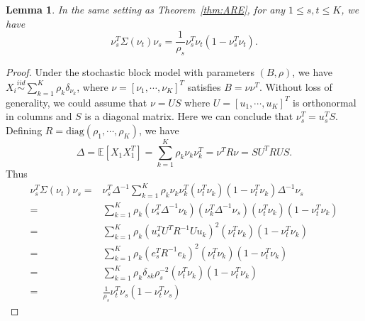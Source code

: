 \documentclass[10pt,letterpaper]{article}
\newtheorem{lemma}[fact]{Lemma}
\renewcommand{\Re}{\mathbb{R}}
\newcommand{\Ex}{\mathbb{E}}
\begin{document}
\begin{lemma}
\label{lm:mseForm}
In the same setting as Theorem~\ref{thm:ARE}, for any $1 \le s, t \le K$, we have
\[
	\nu_s^T \Sigma(\nu_t) \nu_s = \frac{1}{\rho_s} \nu_s^T \nu_t (1- \nu_s^T \nu_t).
\]
\end{lemma}
\begin{proof}
Under the stochastic block model with parameters $(B, \rho)$, we have $X_i \stackrel{iid}{\sim} \sum_{k=1}^K \rho_k \delta_{\nu_k}$, where $\nu = [\nu_1, \cdots, \nu_K]^T$ satisfies $B = \nu \nu^T$. Without loss of generality, we could assume that $\nu = U S$ where $U = [u_1, \cdots, u_K]^T$ is orthonormal in columns and $S$ is a diagonal matrix. Here we can conclude that $\nu_s^T = u_s^T S$. Defining $R = \text{diag}(\rho_1, \cdots, \rho_K)$, we have
\[
	\Delta = \Ex[X_1 X_1^T] = \sum_{k=1}^K \rho_k \nu_k \nu_k^T = \nu^T R \nu = S U^T R U S.
\]
Thus
\begin{align*}
	\nu_s^T \Sigma(\nu_t) \nu_s = &
    \nu_s^T \Delta^{-1} \sum_{k=1}^K \rho_k \nu_k \nu_k^T (\nu_t^T \nu_k)(1 - \nu_t^T \nu_k) \Delta^{-1} \nu_s \\
    = & \sum_{k=1}^K \rho_k (\nu_s^T \Delta^{-1} \nu_k) (\nu_k^T \Delta^{-1} \nu_s) (\nu_t^T \nu_k) (1 - \nu_t^T \nu_k) \\
    = & \sum_{k=1}^K \rho_k (u_s^T U^T R^{-1} U u_k)^2 (\nu_t^T \nu_k) (1 - \nu_t^T \nu_k) \\
    = & \sum_{k=1}^K \rho_k (e_s^T R^{-1} e_k)^2 (\nu_t^T \nu_k) (1 - \nu_t^T \nu_k) \\
    = & \sum_{k=1}^K \rho_k \delta_{sk} \rho_s^{-2} (\nu_t^T \nu_k) (1 - \nu_t^T \nu_k) \\
    = & \frac{1}{\rho_s} \nu_t^T \nu_s (1 - \nu_t^T \nu_s)
\end{align*}
\end{proof}

\end{document}
